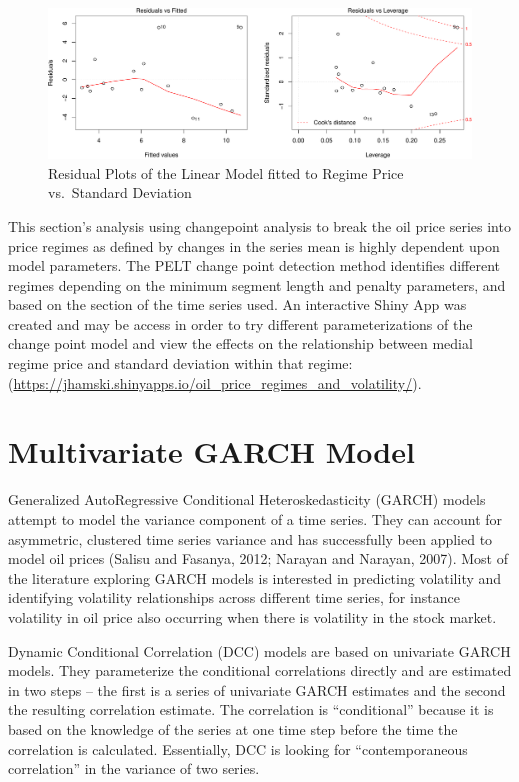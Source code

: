 \documentclass[]{article}
\begin{document}
\begin{figure}[htbp]
\centering
\includegraphics{Figs/unnamed-chunk-18-1.pdf}
\caption{Residual Plots of the Linear Model fitted to Regime Price
vs.~Standard Deviation}
\end{figure}

This section's analysis using changepoint analysis to break the oil
price series into price regimes as defined by changes in the series mean
is highly dependent upon model parameters. The PELT change point
detection method identifies different regimes depending on the minimum
segment length and penalty parameters, and based on the section of the
time series used. An interactive Shiny App was created and may be access
in order to try different parameterizations of the change point model
and view the effects on the relationship between medial regime price and
standard deviation within that regime:
(\url{https://jhamski.shinyapps.io/oil_price_regimes_and_volatility/}).

\section{Multivariate GARCH Model}\label{multivariate-garch-model}

Generalized AutoRegressive Conditional Heteroskedasticity (GARCH) models
attempt to model the variance component of a time series. They can
account for asymmetric, clustered time series variance and has
successfully been applied to model oil prices (Salisu and Fasanya, 2012;
Narayan and Narayan, 2007). Most of the literature exploring GARCH
models is interested in predicting volatility and identifying volatility
relationships across different time series, for instance volatility in
oil price also occurring when there is volatility in the stock market.

Dynamic Conditional Correlation (DCC) models are based on univariate
GARCH models. They parameterize the conditional correlations directly
and are estimated in two steps -- the first is a series of univariate
GARCH estimates and the second the resulting correlation estimate. The
correlation is ``conditional'' because it is based on the knowledge of
the series at one time step before the time the correlation is
calculated. Essentially, DCC is looking for ``contemporaneous
correlation'' in the variance of two series.
\end{document}

